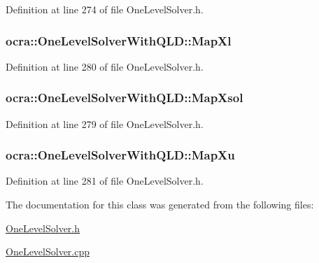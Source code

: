 Definition at line 274 of file One\+Level\+Solver.\+h.

\subsubsection[{\texorpdfstring{Map\+Xl}{MapXl}}]{ ocra\+::\+One\+Level\+Solver\+With\+Q\+L\+D\+::\+Map\+Xl\hspace{0.3cm}{\ttfamily [protected]}}\hypertarget{classocra_1_1OneLevelSolverWithQLD_aad35b068cc43424c11d03acc3fa50efb}{}\label{classocra_1_1OneLevelSolverWithQLD_aad35b068cc43424c11d03acc3fa50efb}


Definition at line 280 of file One\+Level\+Solver.\+h.

\subsubsection[{\texorpdfstring{Map\+Xsol}{MapXsol}}]{ ocra\+::\+One\+Level\+Solver\+With\+Q\+L\+D\+::\+Map\+Xsol\hspace{0.3cm}{\ttfamily [protected]}}\hypertarget{classocra_1_1OneLevelSolverWithQLD_a98bcee40691dd4f96240148c11170fa0}{}\label{classocra_1_1OneLevelSolverWithQLD_a98bcee40691dd4f96240148c11170fa0}


Definition at line 279 of file One\+Level\+Solver.\+h.

\subsubsection[{\texorpdfstring{Map\+Xu}{MapXu}}]{ ocra\+::\+One\+Level\+Solver\+With\+Q\+L\+D\+::\+Map\+Xu\hspace{0.3cm}{\ttfamily [protected]}}\hypertarget{classocra_1_1OneLevelSolverWithQLD_ae775b8d75c6c825a0f689aafc6316b3b}{}\label{classocra_1_1OneLevelSolverWithQLD_ae775b8d75c6c825a0f689aafc6316b3b}


Definition at line 281 of file One\+Level\+Solver.\+h.



The documentation for this class was generated from the following files\+:\begin{DoxyCompactItemize}
\item 
\hyperlink{OneLevelSolver_8h}{One\+Level\+Solver.\+h}\item 
\hyperlink{OneLevelSolver_8cpp}{One\+Level\+Solver.\+cpp}\end{DoxyCompactItemize}
